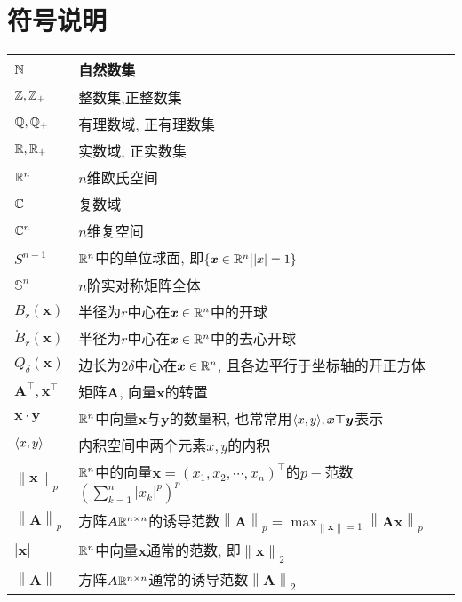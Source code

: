 \section{符号说明}
\begin{longtable}{ll}
\hline
\(\mathbb{N}\)&自然数集\\\hline
\(\mathbb{Z},\mathbb{Z}_+\)&整数集,正整数集\\\hline
\(\mathbb{Q},\mathbb{Q}_+\)&有理数域, 正有理数集\\\hline
\(\mathbb{R},\mathbb{R}_+\)&实数域, 正实数集\\\hline
\(\mathbb{R}^n\)&\(n\)维欧氏空间\\\hline
\(\mathbb{C}\)&复数域\\\hline
\(\mathbb{C}^n\)&\(n\)维复空间\\\hline
\(S^{n-1}\)&\(\mathbb{R}^n\)中的单位球面, 即\(\{\boldsymbol{x}\in\mathbb{R}^n\big||x|=1\}\)\\\hline
\(\mathbb{S}^n\)&\(n\)阶实对称矩阵全体\\\hline
\(B_r(\boldsymbol{x})\)&半径为\(r\)中心在\(\boldsymbol{x}\in\mathbb{R}^n\)中的开球\\\hline
\(\mathring{B}_r(\boldsymbol{x})\)&半径为\(r\)中心在\(\boldsymbol{x}\in\mathbb{R}^n\)中的去心开球\\\hline
\(Q_{\delta}(\boldsymbol{x})\)&边长为\(2\delta\)中心在\(\boldsymbol{x}\in\mathbb{R}^n\), 且各边平行于坐标轴的开正方体\\\hline
\(\boldsymbol{A}^\top,\boldsymbol{x}^\top\)&矩阵\(\boldsymbol{A}\), 向量\(\boldsymbol{x}\)的转置\\\hline
\(\boldsymbol{x}\cdot\boldsymbol{y}\)&\(\mathbb{R}^n\)中向量\(\boldsymbol{x}\)与\(\boldsymbol{y}\)的数量积, 也常常用\(\langle x,y \rangle,\boldsymbol{x\top y}\)表示\\\hline
\(\langle x,y \rangle\)&内积空间中两个元素\(x,y\)的内积\\\hline
\(\left\|\boldsymbol{x}\right\|_p\)&\(\mathbb{R}^n\)中的向量\(\boldsymbol{x}=(x_1,x_2,\cdots,x_n)^\top\)的\(p-\)范数\(\left(\sum_{k=1}^{n}|x_k|^p\right)^p\)\phantom{\huge\(\int\)}\\\hline
\(\left\|\boldsymbol{A}\right\|_p\)&方阵\(\boldsymbol{A}\mathbb{R}^{n\times n}\)的诱导范数\(\left\|\boldsymbol{A}\right\|_p=\max_{\left\|\boldsymbol{x}\right\|=1}\left\|\boldsymbol{Ax}\right\|_p\)\\\hline
\(|\boldsymbol{x}|\)&\(\mathbb{R}^n\)中向量\(\boldsymbol{x}\)通常的范数, 即\(\left\|\boldsymbol{x}\right\|_2\)\\\hline
\(\left\|\boldsymbol{A}\right\|\)&方阵\(\boldsymbol{A}\mathbb{R}^{n\times n}\)通常的诱导范数\(\left\|\boldsymbol{A}\right\|_2\)\\\hline

\end{longtable}
